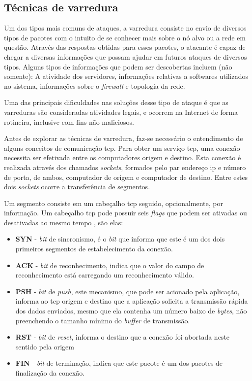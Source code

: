 \subsection{Técnicas de varredura}
\label{sec:varredura}

Um dos tipos mais comuns de ataques, a varredura consiste no envio de diversos tipos de pacotes com o intuito de se conhecer mais sobre o nó alvo ou a rede em questão. Através das respostas obtidas para esses pacotes, o atacante é capaz de chegar a diversas informações que possam ajudar em futuros ataques de diversos tipos. Alguns tipos de informações que podem ser descobertas incluem (não somente): A atividade dos servidores, informações relativas a softwares utilizados no sistema, informações sobre o \textit{firewall} e topologia da rede.

Uma das principais dificuldades nas soluções desse tipo de ataque é que as varreduras são consideradas atividades legais, e ocorrem na Internet de forma rotineira, inclusive com fins não maliciosos.

Antes de explorar as técnicas de varredura, faz-se necessário o entendimento de alguns conceitos de comunicação \gls{tcp}. Para obter um serviço \gls{tcp}, uma conexão necessita ser efetivada entre os computadores origem e destino. Esta conexão é realizada através dos chamados \textit{sockets}, formados pelo par endereço \gls{ip} e número de porta, de ambos, computador de origem e computador de destino. Entre estes dois \textit{sockets} ocorre a transferência de segmentos.

Um segmento consiste em um cabeçalho \gls{tcp} seguido, opcionalmente, por informação. Um cabeçalho \gls{tcp} pode possuir seis \textit{flags} que podem ser ativadas ou desativadas ao mesmo tempo \cite{Comer:1988}, são elas:

\begin{itemize}
    \item \textbf{SYN} - \textit{bit} de sincronismo, é o \textit{bit} que informa que este é um dos dois primeiros segmentos de estabelecimento da conexão.
    \item \textbf{ACK} - \textit{bit} de reconhecimento, indica que o valor do campo de reconhecimento está carregando um reconhecimento válido.
    \item \textbf{PSH} - \textit{bit} de \textit{push}, este mecanismo, que pode ser acionado pela aplicação, informa ao \gls{tcp} origem e destino que a aplicação solicita a transmissão rápida dos dados enviados, mesmo que ela contenha um número baixo de \textit{bytes}, não preenchendo o tamanho mínimo do \textit{buffer} de transmissão.
    \item \textbf{RST} - \textit{bit} de \textit{reset}, informa o destino que a conexão foi abortada neste sentido pela origem
    \item \textbf{FIN} - \textit{bit} de terminação, indica que este pacote é um dos pacotes de finalização da conexão.
\end{itemize}

